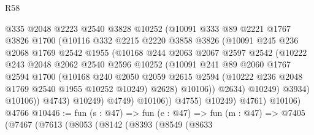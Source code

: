 \begin{lexlean}{R58}
\begin{coremodule}
                        @335
                        @2048
                        @2223
                        @2540
                        @3828
                        @10252
                        (@10091
                          @333
                          @89
                          @2221
                          @1767
                          @3826
                          @1700
                          (@10116
                            @332
                            @2215
                            @2220
                            @3858
                            @3826
                            (@10091
                              @245
                              @236
                              @2068
                              @1769
                              @2542
                              @1955
                              (@10168
                                @244
                                @2063
                                @2067
                                @2597
                                @2542
                                (@10222
                                  @243
                                  @2048
                                  @2062
                                  @2540
                                  @2596
                                  @10252
                                  (@10091
                                    @241
                                    @89
                                    @2060
                                    @1767
                                    @2594
                                    @1700
                                    (@10168
                                      @240
                                      @2050
                                      @2059
                                      @2615
                                      @2594
                                      (@10222 @236 @2048 @1769 @2540 @1955 @10252 @10249)
                                      @2628)
                                    @10106))
                                @2634)
                              @10249)
                            @3934)
                          @10106))
                      @4743)
                    @10249)
                  @4749)
                @10106))
            @4755)
          @10249)
        @4761)
      @10106)
    @4766
@10446 := fun (s : @47) =>
  fun (e : @47) =>
  fun (m : @47) =>
  @7405
    (@7467
      (@7613
        (@8053
          (@8142
            (@8393
              (@8549
                (@8633

\end{coremodule}
\end{lexlean}
